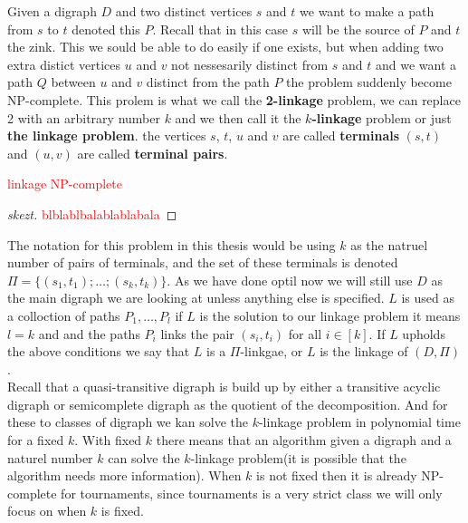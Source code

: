 Given a digraph $D$ and two distinct vertices $s$ and $t$ we want to make a path from $s$ to $t$ denoted this $P$. 
Recall that in this case $s$ will be the source of $P$ and $t$ the zink.
This we sould be able to do easily if one exists, but when adding two extra distict vertices $u$ and $v$ not nessesarily distinct from $s$ and $t$ and we want a path $Q$ between $u$ and $v$ distinct from the path $P$ the problem suddenly become NP-complete.
This prolem is what we call the \textbf{2-linkage} problem, we can replace 2 with an arbitrary number $k$ and we then call it the \textbf{$k$-linkage} problem or just \textbf{the linkage problem}. 
the vertices $s$, $t$, $u$ and $v$ are called \textbf{terminals} $(s,t)$ and $(u,v)$ are called \textbf{terminal pairs}.
\begin{thm}
    \textcolor{red}{linkage NP-complete}
\end{thm}
\begin{proof}[skezt]
    \textcolor{red}{blblablbalablablabala}
\end{proof}
The notation for this problem in this thesis would be using $k$ as the natruel number of pairs of terminals, and the set of these terminals is denoted $\Pi=\lbrace (s_1,t_1);\dots ;(s_k,t_k)\rbrace$. 
As we have done optil now we will still use $D$ as the main digraph we are looking at unless anything else is specified. 
$L$ is used as a colloction of paths $P_1,\dots , P_l$ if $L$ is the solution to our linkage problem it means $l=k$ and and the paths $P_i$ links the pair $(s_i,t_i)$ for all $i\in [k]$.
If $L$ upholds the above conditions we say that $L$ is a $\Pi$-linkgae, or $L$ is the linkage of $(D,\Pi)$.\\
Recall that a quasi-transitive digraph is build up by either a transitive acyclic digraph or semicomplete digraph as the quotient of the decomposition. 
And for these to classes of digraph we kan solve the $k$-linkage problem in polynomial time for a fixed $k$. With fixed $k$ there means that an algorithm given a digraph and a naturel number $k$ can solve the $k$-linkage problem(it is possible that the algorithm needs more information). When $k$ is not fixed then it is already NP-complete for tournaments, since tournaments is a very strict class we will only focus on when $k$ is fixed.
